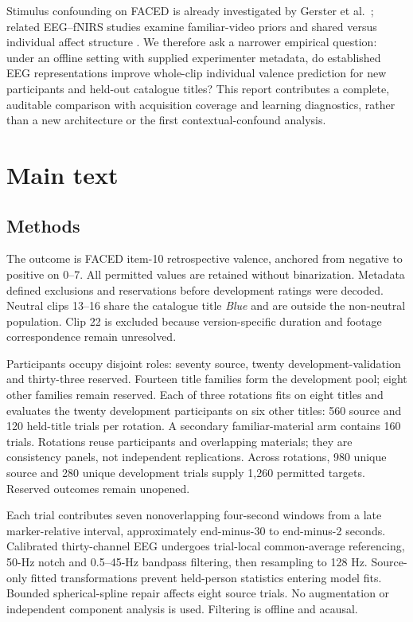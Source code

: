 \documentclass[11pt,a4paper]{article}
\begin{document}
Stimulus confounding on FACED is already investigated by Gerster et al.\ \cite{gerster2026stimulus}; related EEG--fNIRS studies examine familiar-video priors and shared versus individual affect structure \cite{kong2026priors,wang2026shared}. We therefore ask a narrower empirical question: under an offline setting with supplied experimenter metadata, do established EEG representations improve whole-clip individual valence prediction for new participants and held-out catalogue titles? This report contributes a complete, auditable comparison with acquisition coverage and learning diagnostics, rather than a new architecture or the first contextual-confound analysis.

\section*{Main text}
\subsection*{Methods}
The outcome is FACED item-10 retrospective valence, anchored from negative to positive on 0--7. All permitted values are retained without binarization. Metadata defined exclusions and reservations before development ratings were decoded. Neutral clips 13--16 share the catalogue title \emph{Blue} and are outside the non-neutral population. Clip 22 is excluded because version-specific duration and footage correspondence remain unresolved.

Participants occupy disjoint roles: seventy source, twenty development-validation and thirty-three reserved. Fourteen title families form the development pool; eight other families remain reserved. Each of three rotations fits on eight titles and evaluates the twenty development participants on six other titles: 560 source and 120 held-title trials per rotation. A secondary familiar-material arm contains 160 trials. Rotations reuse participants and overlapping materials; they are consistency panels, not independent replications. Across rotations, 980 unique source and 280 unique development trials supply 1,260 permitted targets. Reserved outcomes remain unopened.

Each trial contributes seven nonoverlapping four-second windows from a late marker-relative interval, approximately end-minus-30 to end-minus-2 seconds. Calibrated thirty-channel EEG undergoes trial-local common-average referencing, 50-Hz notch and 0.5--45-Hz bandpass filtering, then resampling to 128 Hz. Source-only fitted transformations prevent held-person statistics entering model fits. Bounded spherical-spline repair affects eight source trials. No augmentation or independent component analysis is used. Filtering is offline and acausal.
\end{document}
